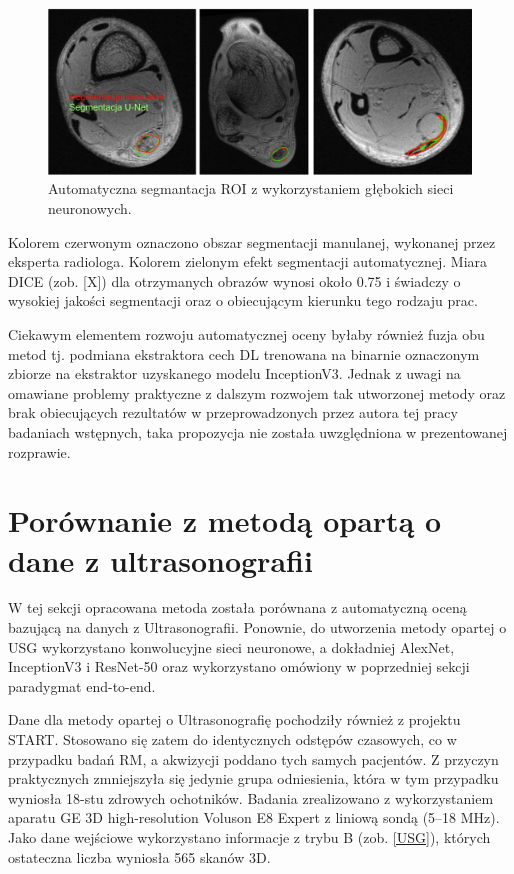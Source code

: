 \begin{figure}[h]
	\centering
	\includegraphics[width=1\textwidth]{figures/Segmentacja.png}
	\caption{Automatyczna segmantacja ROI z wykorzystaniem głębokich sieci neuronowych.}\label{fig:segmentacja}
\end{figure}
Kolorem czerwonym oznaczono obszar segmentacji manulanej, wykonanej przez eksperta radiologa. Kolorem zielonym efekt segmentacji automatycznej. Miara DICE (zob. [X]) dla otrzymanych obrazów wynosi około 0.75 i świadczy o wysokiej jakości segmentacji oraz o obiecującym kierunku tego rodzaju prac.

Ciekawym elementem rozwoju automatycznej oceny byłaby również fuzja obu metod tj. podmiana ekstraktora cech DL trenowana na binarnie oznaczonym zbiorze na ekstraktor uzyskanego modelu InceptionV3. Jednak z uwagi na omawiane problemy praktyczne z dalszym rozwojem tak utworzonej metody oraz brak obiecujących rezultatów w przeprowadzonych przez autora tej pracy badaniach wstępnych, taka propozycja nie została uwzględniona w prezentowanej rozprawie. 

\section{Porównanie z metodą opartą o dane z ultrasonografii}
\label{seq:comp-usg}
W tej sekcji opracowana metoda została porównana z automatyczną oceną bazującą na danych z Ultrasonografii. Ponownie, do utworzenia metody opartej o USG wykorzystano konwolucyjne sieci neuronowe, a dokładniej AlexNet, InceptionV3 i ResNet-50 oraz wykorzystano omówiony w poprzedniej sekcji paradygmat end-to-end. 

Dane dla metody opartej o Ultrasonografię pochodziły również z projektu START. Stosowano się zatem do identycznych odstępów czasowych, co w przypadku badań RM, a akwizycji poddano tych samych pacjentów. Z przyczyn praktycznych zmniejszyła się jedynie grupa odniesienia, która w tym przypadku wyniosła 18-stu zdrowych ochotników. Badania zrealizowano z wykorzystaniem aparatu GE 3D high-resolution Voluson E8 Expert z liniową sondą (5--18 MHz). Jako dane wejściowe wykorzystano informacje z trybu B (zob. \ref{USG}), których ostateczna liczba wyniosła 565 skanów 3D. 

